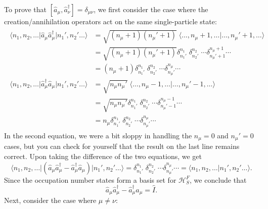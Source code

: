 \documentclass[pra,12pt]{revtex4}
\begin{document}
To prove that $[\hat{a}_\mu,\hat{a}_\nu^\dagger] = \delta_{\mu\nu}$,
we first consider the case where the creation/annihilation operators
act on the same single-particle state:
\begin{align}
  \begin{aligned}\big\langle n_1, n_2, \dots \big| \hat{a}_\mu \hat{a}_\mu^\dagger \big| n_1', n_2'\dots\big\rangle &= \sqrt{(n_\mu+1)(n_\mu'+1)}\; \big\langle \dots, n_\mu+1, \dots \big| \dots, n_\mu'+1, \dots\big\rangle \\ &= \sqrt{(n_\mu+1)(n_\mu'+1)} \delta^{n_1}_{n_1'} \; \delta^{n_2}_{n_2'} \; \cdots \delta^{n_\mu+1}_{n_\mu'+1}\cdots \\ &= (n_\mu+1) \delta^{n_1}_{n_1'} \; \delta^{n_2}_{n_2'} \; \cdots \delta^{n_\mu}_{n_\mu'}\cdots \\ \big\langle n_1, n_2, \dots \big| \hat{a}_\mu^\dagger \hat{a}_\mu \big| n_1', n_2'\dots\big\rangle &= \sqrt{n_\mu n_\mu'}\; \big\langle \dots, n_\mu-1, \dots \big| \dots, n_\mu'-1, \dots\big\rangle \\&= \sqrt{n_\mu n_\mu'} \delta^{n_1}_{n_1'} \; \delta^{n_2}_{n_2'} \; \cdots \delta^{n_\mu-1}_{n_\mu'-1}\cdots \\ &= n_\mu \delta^{n_1}_{n_1'} \; \delta^{n_2}_{n_2'} \; \cdots \delta^{n_\mu}_{n_\mu'}\cdots \end{aligned}
\end{align}
In the second equation, we were a bit sloppy in handling the $n_\mu =
0$ and $n_\mu' = 0$ cases, but you can check for yourself that the
result on the last line remains correct.  Upon taking the
difference of the two equations, we get
\begin{equation}
  \big\langle n_1, n_2, \dots \big| \left(\hat{a}_\mu \hat{a}_\mu^\dagger - \hat{a}_\mu^\dagger \hat{a}_\mu\right) \big| n_1', n_2'\dots\big\rangle = \delta^{n_1}_{n_1'} \; \delta^{n_2}_{n_2'} \; \cdots \delta^{n_\mu}_{n_\mu'}\cdots = \big\langle n_1, n_2, \dots \big| n_1', n_2'\dots\big\rangle.
\end{equation}
Since the occupation number states form a basis set for
$\mathscr{H}^F_S$, we conclude that
\begin{equation}
  \hat{a}_\mu \hat{a}_\mu^\dagger - \hat{a}_\mu^\dagger \hat{a}_\mu = \hat{I}.
\end{equation}
Next, consider the case where $\mu \ne \nu$:
\end{document}
